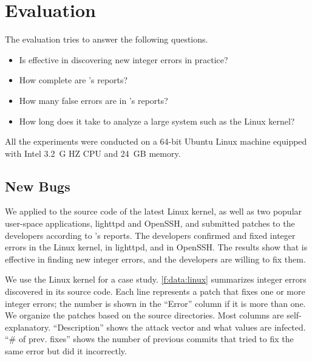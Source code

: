 \section{Evaluation}
\label{s:eval}

The evaluation tries to answer the following questions.
\begin{itemize}
\item
Is \sys effective in discovering new integer errors in practice?
\item
How complete are \sys's reports?
\item
How many false errors are in \sys's reports?
\item
How long does it take \sys to analyze a large system such
as the Linux kernel?
\end{itemize}

All the experiments were conducted on a 64-bit Ubuntu Linux machine
equipped with Intel 3.2~G HZ CPU and 24~GB memory.

\subsection{New Bugs}
\label{s:eval:linux}

We applied \sys to the source code of the latest Linux kernel,
as well as two popular user-space applications, lighttpd and OpenSSH,
and submitted patches to the developers according to \sys's reports.
The developers confirmed and fixed \nrbugslinux integer errors in
the Linux kernel, \nrbugslighttpd in lighttpd, and \nrbugsopenssh in OpenSSH.
%
The results show that \sys is effective in finding new integer
errors, and the developers are willing to fix them.

We use the Linux kernel for a case study.  \autoref{f:data:linux}
summarizes integer errors \sys discovered in its source code.
Each line represents a patch that fixes one or more integer errors; the
number is shown in the ``Error'' column if it is more than one.  We
organize the patches based on the source directories.  Most
columns are self-explanatory.  ``Description'' shows the attack
vector and what values are infected.  ``\# of prev. fixes'' shows
the number of previous commits that tried to fix the same error but
did it incorrectly. 

